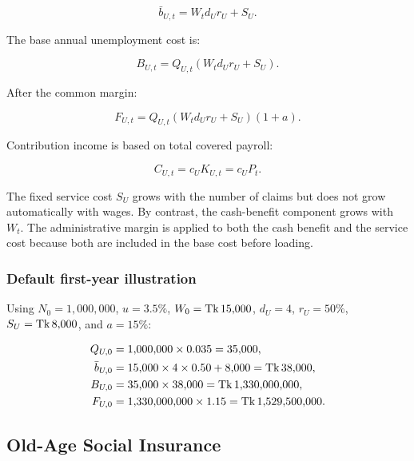 \begin{equation}
\bar{b}_{U,t}=W_td_Ur_U+S_U.
\end{equation}

The base annual unemployment cost is:

\begin{equation}
B_{U,t}=Q_{U,t}\left(W_td_Ur_U+S_U\right).
\end{equation}

After the common margin:

\begin{equation}
F_{U,t}=Q_{U,t}\left(W_td_Ur_U+S_U\right)(1+a).
\end{equation}

Contribution income is based on total covered payroll:

\begin{equation}
C_{U,t}=c_UK_{U,t}=c_UP_t.
\end{equation}

\begin{interpretation}
The fixed service cost $S_U$ grows with the number of claims but does not grow automatically with wages. By contrast, the cash-benefit component grows with $W_t$. The administrative margin is applied to both the cash benefit and the service cost because both are included in the base cost before loading.
\end{interpretation}

\subsubsection*{Default first-year illustration}
Using $N_0=1{,}000{,}000$, $u=3.5\%$, $W_0=\text{Tk}\,15{,}000$, $d_U=4$, $r_U=50\%$, $S_U=\text{Tk}\,8{,}000$, and $a=15\%$:

\begin{align}
Q_{U,0} &=1{,}000{,}000\times0.035=35{,}000,\\
\bar{b}_{U,0} &=15{,}000\times4\times0.50+8{,}000=\text{Tk}\,38{,}000,\\
B_{U,0} &=35{,}000\times38{,}000=\text{Tk}\,1{,}330{,}000{,}000,\\
F_{U,0} &=1{,}330{,}000{,}000\times1.15=\text{Tk}\,1{,}529{,}500{,}000.
\end{align}

\subsection{Old-Age Social Insurance}


